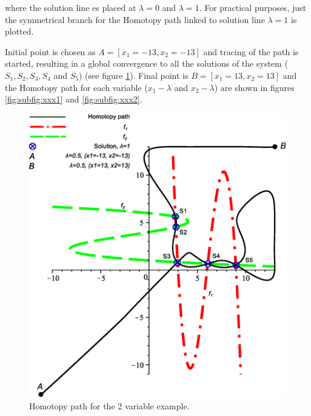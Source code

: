 \documentclass[conference,letterpaper,onecolumn]{IEEEtran}
\begin{document}
{where the solution line es placed at $\lambda=0$ and $\lambda=1$. For practical purposes, just the symmetrical branch for the Homotopy path linked to solution line $\lambda=1$ is plotted.

Initial point is chosen as $A=[x_1=-13,x_2=-13]$ and tracing of the path is started, resulting in a global convergence to all the solutions of the system ($S_1,S_2,S_3,S_4$ and $S_5$) (see figure \ref{homotex}). Final point is $B=[x_1=13, x_2=13]$ and the Homotopy path for each variable ($x_1-\lambda$ and $x_2-\lambda$) are shown in figures \ref{fig:subfig:xxx1} and \ref{fig:subfig:xxx2}.

\begin{figure}[hbtp]
\centering
\includegraphics[scale=0.5]{ejem4lim/POLINOM4LIMA.eps}
\caption{Homotopy path for the 2 variable example.}
\label{homotex}
\end{figure}

}
\end{document}

